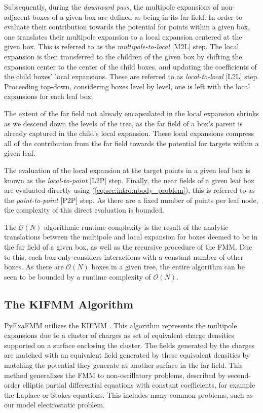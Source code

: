 \documentclass{IEEEcsmag}
\begin{document}
Subsequently, during the \textit{downward pass}, the multipole expansions of non-adjacent boxes of a given box are defined as being in its far field. In order to evaluate their contribution towards the potential for points within a given box, one translates their multipole expansion to a local expansion centered at the given box. This is referred to as the \textit{multipole-to-local} [M2L] step. The local expansion is then transferred to the children of the given box by shifting the expansion center to the center of the child boxes, and updating the coefficients of the child boxes' local expansions. These are referred to as \textit{local-to-local} [L2L] step. Proceeding top-down, considering boxes level by level, one is left with the local expansions for each leaf box.

The extent of the far field not already encapsulated in the local expansion shrinks as we descend down the levels of the tree, as the far field of a box's parent is already captured in the child's local expansion. These local expansions compress all of the contribution from the far field towards the potential for targets within a given leaf.

The evaluation of the local expansion at the target points in a given leaf box is known as the \textit{local-to-point} [L2P] step. Finally, the near fields of a given leaf box are evaluated directly using (\ref{eq:sec:intro:nbody_problem}), this is referred to as the \textit{point-to-point} [P2P] step. As there are a fixed number of points per leaf node, the complexity of this direct evaluation is bounded.

The $\mathcal{O}(N)$ algorithmic runtime complexity is the result of the analytic translations between the multipole and local expansion for boxes deemed to be in the far field of a given box, as well as the recursive procedure of the FMM. Due to this, each box only considers interactions with a constant number of other boxes. As there are $\mathcal{O}(N)$ boxes in a given tree, the entire algorithm can be seen to be bounded by a runtime complexity of $\mathcal{O}(N)$.

\subsection{The KIFMM Algorithm}

PyExaFMM utilizes the KIFMM \cite{Ying2004}. This algorithm represents the multipole expansions due to a cluster of charges as set of equivalent charge densities supported on a surface enclosing the cluster. The fields generated by the charges are matched with an equivalent field generated by these equivalent densities by matching the potential they generate at another surface in the far field. This method generalizes the FMM to non-oscillatory problems, described by second-order elliptic partial differential equations with constant coefficients, for example the Laplace or Stokes equations. This includes many common problems, such as our model electrostatic problem.
\end{document}
